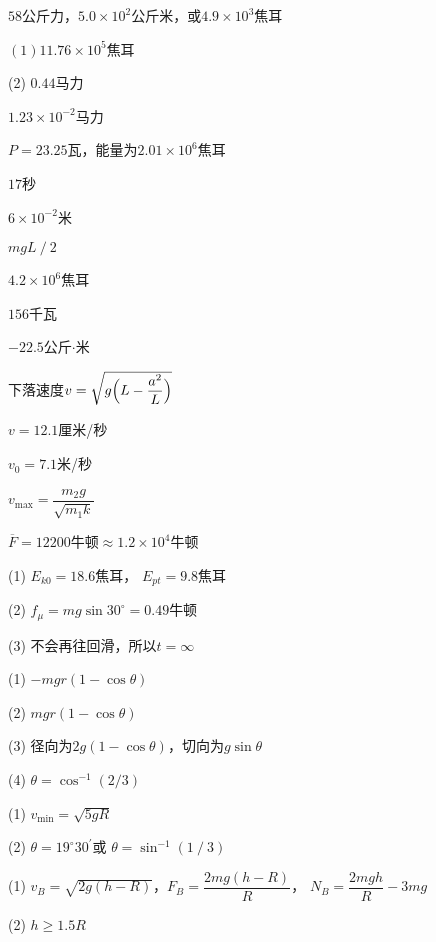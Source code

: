\documentclass[../outline-of-mechanics.tex]{subfiles}
\begin{document}
\achapter

\answer $ 58 $公斤力，$ 5.0\times 10^2 $公斤米，或$ 4.9\times 10 ^3$焦耳

\answer $ (1) 11.76\times 1 0 ^ { 5 } $焦耳

(2) $ 0.44 $马力

\answer $ 1 . 2 3 \times 1 0 ^ { -2 } $马力

\answer $ P = 2 3 . 2 5 $瓦，能量为$ 2.01\times 10 ^ 6 $焦耳

\answer $ 17 $秒

\answer $ 6 \times 1 0 ^ { - 2 } $米

\answer $ m g L \operatorname{/} 2 $

\answer $ 4 . 2 \times 1 0 ^ { 6 } $焦耳

\answer $ 156 $千瓦

\answer $ -22.5 $公斤$ \cdot $米

\addtocounter{answer}{2}
\answer 下落速度$v=\sqrt{g\Bigl(L-\dfrac{a^{2}}{L}\Bigr)}$

\answer $ v = 1 2 . 1 $厘米/秒


\answer $ v _ { 0 } = 7 . 1 $米/秒

\answer
$ v _ { \text{max} } = \dfrac { m _ { 2 } g } { \sqrt { m _ { 1 } k } } $

\answer $ \overline { F } = 1 2 2 0 0 $牛顿$ \approx 1.2\times 10 ^ 4 $牛顿

\answer (1) $ E _ { k 0 } = 1 8 . 6 $焦耳， $ E _ { pt } = 9 . 8 $焦耳

(2) $ f _ { \mu } = m g \sin 3 0 ^ { \circ } = 0 . 4 9 $牛顿

(3) 不会再往回滑，所以$ t = \infty $

\answer (1) $ - m g r \left( 1 - \cos \theta \right) $

(2) $ m g r \left( 1 - \cos \theta \right) $

(3) 径向为$ 2 g \left( 1 - \cos \theta \right) $，切向为$ g \sin \theta $

(4) $ \theta = \cos ^ { - 1 } \left( 2 / 3 \right) $

\answer (1) $ v _ { \text{min} } = \sqrt { 5 g R } $

(2) $ \theta = 1 9 ^ { \circ } 3 0 ^ { \prime } $或 $ \theta = \sin ^ { - 1 } \left( 1 \operatorname{/} 3 \right) $

\answer (1) $ v _ { B } = \sqrt { 2 g \left( h - R \right) } $，$ F _ { B } = \dfrac { 2 m g \left( h - R \right) } {R} $，
$ N _ { B } = \dfrac { 2 m g h } { R } - 3 m g $

(2) $ h \geqslant 1 . 5 R $
\end{document}
